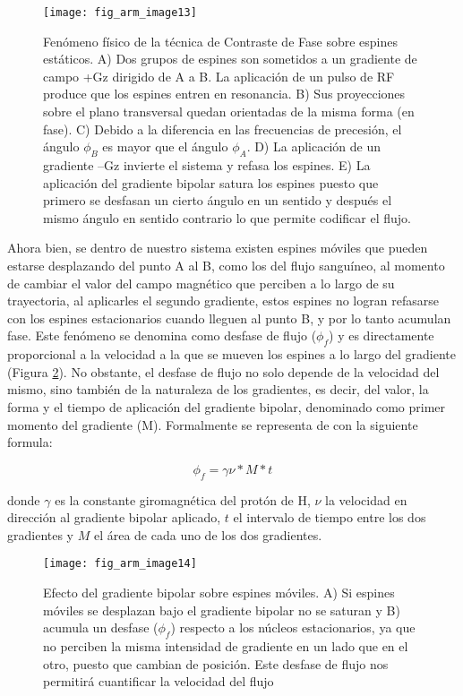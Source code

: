 \begin{figure}[htbp]
\begin{figg}
 \texttt{[image: fig\_arm\_image13]}
 \caption{
Fenómeno físico de la técnica de Contraste de Fase sobre espines estáticos. A) Dos grupos de espines son sometidos a un gradiente de campo +Gz dirigido de A a B. La aplicación de un pulso de RF produce que los espines entren en resonancia. B) Sus proyecciones sobre el plano transversal quedan orientadas de la misma forma (en fase). C) Debido a la diferencia en las frecuencias de precesión, el ángulo $\phi_B$ es mayor que el ángulo $\phi_A$. D) La aplicación de un gradiente –Gz invierte el sistema y refasa los espines. E) La aplicación del gradiente bipolar satura los espines puesto que primero se desfasan un cierto ángulo en un sentido y después el mismo ángulo en sentido contrario lo que permite codificar el flujo. 
 }
 \label{fig:arm_image13}
\end{figg}
\end{figure}



Ahora bien, se dentro de nuestro sistema existen espines móviles que pueden estarse desplazando del punto A al B, como los del flujo sanguíneo, al momento de cambiar el valor del campo magnético que perciben a lo largo de su trayectoria, al aplicarles el segundo gradiente, estos espines no logran refasarse con los espines estacionarios cuando lleguen al punto B, y por lo tanto acumulan fase. Este fenómeno se denomina como desfase de flujo ($\phi_f$) y es directamente proporcional a la velocidad a la que se mueven los espines a lo largo del gradiente (Figura \ref{fig:arm_image14}). No obstante, el desfase de flujo no solo depende de la velocidad del mismo, sino también de la naturaleza de los gradientes, es decir, del valor, la forma y el tiempo de aplicación del gradiente bipolar, denominado como primer momento del gradiente (M). Formalmente se representa de con la siguiente formula:

\begin{equation}
 \phi_f = \gamma\nu * M * t
\end{equation}

donde $\gamma$ es la constante giromagnética del protón de H, $\nu$ la velocidad en dirección al gradiente bipolar aplicado, $t$ el intervalo de tiempo entre los dos gradientes y $M$ el área de cada uno de los dos  gradientes.



\begin{figure}[htbp]
\begin{figg}
 \texttt{[image: fig\_arm\_image14]}
 \caption{
 Efecto del gradiente bipolar sobre espines móviles. A) Si espines móviles se desplazan bajo el gradiente bipolar no se saturan y B) acumula un desfase ($\phi_f$) respecto a los núcleos estacionarios, ya que no perciben la misma intensidad de gradiente en un lado que en el otro, puesto que cambian de posición. Este desfase de flujo nos permitirá cuantificar la velocidad del flujo
 }
 \label{fig:arm_image14}
\end{figg}
\end{figure}




